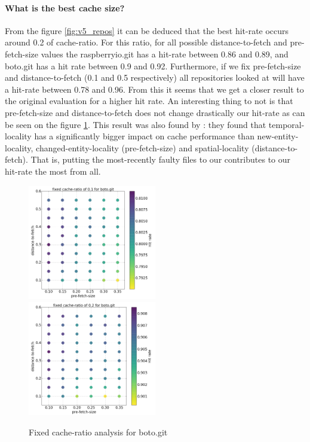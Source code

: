 \documentclass[12pt,twoside,notitlepage]{report}
\begin{document}
\paragraph{What is the best cache size?}
From the figure \ref{fig:v5_repos} it can be deduced that the best hit-rate occurs around 0.2 of cache-ratio. For this ratio, for all possible distance-to-fetch and pre-fetch-size values the raspberryio.git has a hit-rate between 0.86 and 0.89, and boto.git has a hit rate between 0.9 and 0.92. Furthermore, if we fix pre-fetch-size and distance-to-fetch (0.1 and 0.5 respectively) all repositories looked at will have a hit-rate between 0.78 and 0.96. From this it seems that we get a closer result to the original evaluation for a higher hit rate.
An interesting thing to not is that pre-fetch-size and distance-to-fetch does not change drastically our hit-rate as can be seen on the figure \ref{fig:fixed_cache}. This result was also found by \cite{Bugcache}: they found that temporal-locality has a significantly bigger impact on cache performance than new-entity-locality, changed-entity-locality (pre-fetch-size) and spatial-locality (distance-to-fetch). That is, putting the most-recently faulty files to our contributes to our hit-rate the most from all.
\begin{figure}[t]
\includegraphics[width=0.5\textwidth]{fixed_cache-1.png}
\includegraphics[width=0.5\textwidth]{fixed_cache-2.png}
\caption{Fixed cache-ratio analysis for boto.git}
\label{fig:fixed_cache}
\end{figure}
\end{document}
